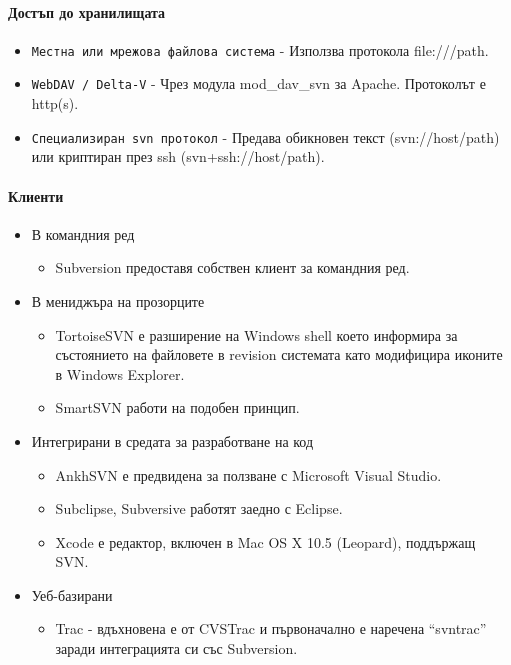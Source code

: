 \documentclass[a4paper]{article}
\begin{document}
    \paragraph{Достъп до хранилищата}

    \begin{itemize}
      \item \texttt{Местна или мрежова файлова система} - Използва протокола file:///path.
      \item \texttt{WebDAV / Delta-V} - Чрез модула mod\_dav\_svn за Apache. Протоколът е http(s).
      \item \texttt{Специализиран svn протокол} - Предава обикновен текст (svn://host/path) или криптиран през ssh (svn+ssh://host/path).
    \end{itemize}

    \paragraph{Клиенти}

    \begin{itemize}
      \item В командния ред
        \begin{itemize}
          \item Subversion предоставя собствен клиент за командния ред.
        \end{itemize}
      \item В мениджъра на прозорците
        \begin{itemize}
          \item TortoiseSVN е разширение на Windows shell което информира за състоянието на файловете в revision системата като модифицира иконите в Windows Explorer.
          \item SmartSVN работи на подобен принцип.
        \end{itemize}
      \item Интегрирани в средата за разработване на код
        \begin{itemize}
          \item AnkhSVN е предвидена за ползване с Microsoft Visual Studio.
          \item Subclipse, Subversive работят заедно с Eclipse.
          \item Xcode е редактор, включен в Mac OS X 10.5 (Leopard), поддържащ SVN.
        \end{itemize}
      \item Уеб-базирани
        \begin{itemize}
          \item Trac - вдъхновена е от CVSTrac и първоначално е наречена ``svntrac'' заради интеграцията си със Subversion.
        \end{itemize}
    \end{itemize}
\end{document}
